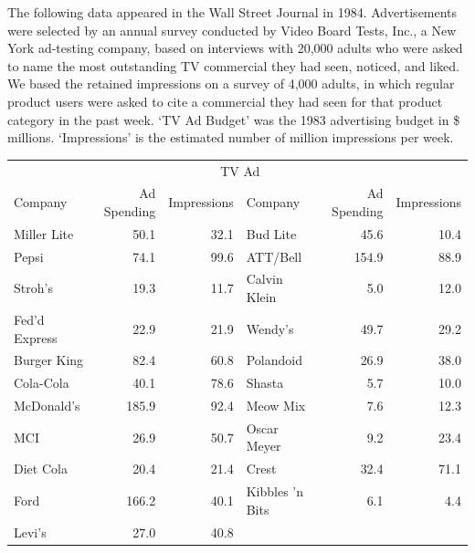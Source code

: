 \documentclass[11pt, chapterprefix=true]{scrbook}\usepackage[]{graphicx}\usepackage[]{color}
\begin{document}

The following data appeared in the Wall Street Journal in 1984.  Advertisements were selected by an annual survey conducted by Video Board Tests, Inc., a New York ad-testing company, based on interviews with 20,000 adults who were asked to name the most outstanding TV commercial they had seen, noticed, and liked. We based the retained impressions on a survey of 4,000 adults, in which regular product users were asked to cite a commercial they had seen for that product category in the past week.  `TV Ad Budget' was the 1983 advertising budget in \$ millions.  `Impressions' is the estimated number of million impressions per week.

\begin{table}[ht]
\centering 
\begin{tabular}{@{} lrr | lrr @{}} \hline
& \multicolumn{4}{c}{TV Ad} \\
Company & Ad Spending & Impressions & Company & Ad Spending & Impressions \\ \hline
Miller Lite & 50.1 & 32.1 & Bud Lite & 45.6 & 10.4\\
Pepsi & 74.1 & 99.6 & ATT/Bell & 154.9 & 88.9 \\
Stroh's & 19.3 & 11.7 & Calvin Klein & 5.0 & 12.0\\
Fed'd Express & 22.9 & 21.9 & Wendy's & 49.7 & 29.2\\
Burger King & 82.4 & 60.8 & Polandoid & 26.9 & 38.0\\
Cola-Cola & 40.1 & 78.6 & Shasta & 5.7 & 10.0\\
McDonald's & 185.9 & 92.4 & Meow Mix & 7.6 & 12.3\\
MCI & 26.9 & 50.7 & Oscar Meyer & 9.2 & 23.4\\
Diet Cola & 20.4 & 21.4 & Crest & 32.4 & 71.1\\
Ford & 166.2 & 40.1 & Kibbles 'n Bits & 6.1 & 4.4\\
Levi's & 27.0 & 40.8 \\ \hline
\end{tabular}
\end{table}
\end{document}
